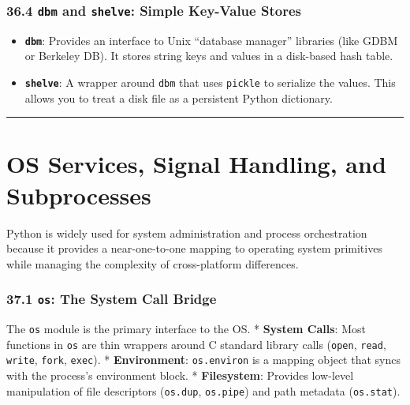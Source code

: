 \hypertarget{dbm-and-shelve-simple-key-value-stores}{%
\subsection{\texorpdfstring{36.4 \texttt{dbm} and \texttt{shelve}:
Simple Key-Value
Stores}{36.4 dbm and shelve: Simple Key-Value Stores}}\label{dbm-and-shelve-simple-key-value-stores}}

\begin{itemize}
\tightlist
\item
  \textbf{\passthrough{\lstinline!dbm!}}: Provides an interface to Unix
  ``database manager'' libraries (like GDBM or Berkeley DB). It stores
  string keys and values in a disk-based hash table.
\item
  \textbf{\passthrough{\lstinline!shelve!}}: A wrapper around
  \passthrough{\lstinline!dbm!} that uses
  \passthrough{\lstinline!pickle!} to serialize the values. This allows
  you to treat a disk file as a persistent Python dictionary.
\end{itemize}

\begin{center}\rule{0.5\linewidth}{0.5pt}\end{center}

\hypertarget{os-services-signal-handling-and-subprocesses}{%
\chapter{OS Services, Signal Handling, and
Subprocesses}\label{os-services-signal-handling-and-subprocesses}}

Python is widely used for system administration and process
orchestration because it provides a near-one-to-one mapping to operating
system primitives while managing the complexity of cross-platform
differences.

\hypertarget{os-the-system-call-bridge}{%
\subsection{\texorpdfstring{37.1 \texttt{os}: The System Call
Bridge}{37.1 os: The System Call Bridge}}\label{os-the-system-call-bridge}}

The \passthrough{\lstinline!os!} module is the primary interface to the
OS. * \textbf{System Calls}: Most functions in
\passthrough{\lstinline!os!} are thin wrappers around C standard library
calls (\passthrough{\lstinline!open!}, \passthrough{\lstinline!read!},
\passthrough{\lstinline!write!}, \passthrough{\lstinline!fork!},
\passthrough{\lstinline!exec!}). * \textbf{Environment}:
\passthrough{\lstinline!os.environ!} is a mapping object that syncs with
the process's environment block. * \textbf{Filesystem}: Provides
low-level manipulation of file descriptors
(\passthrough{\lstinline!os.dup!}, \passthrough{\lstinline!os.pipe!})
and path metadata (\passthrough{\lstinline!os.stat!}).

